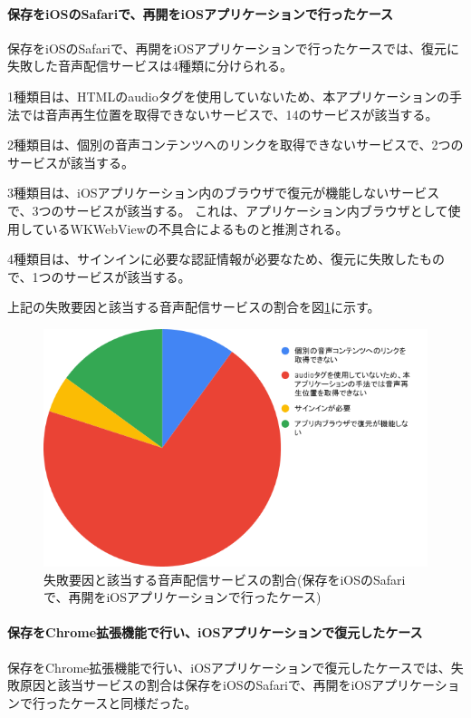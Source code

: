 \paragraph{保存をiOSのSafariで、再開をiOSアプリケーションで行ったケース}
保存をiOSのSafariで、再開をiOSアプリケーションで行ったケースでは、復元に失敗した音声配信サービスは4種類に分けられる。

1種類目は、HTMLのaudioタグを使用していないため、本アプリケーションの手法では音声再生位置を取得できないサービスで、14のサービスが該当する。

2種類目は、個別の音声コンテンツへのリンクを取得できないサービスで、2つのサービスが該当する。

3種類目は、iOSアプリケーション内のブラウザで復元が機能しないサービスで、3つのサービスが該当する。
これは、アプリケーション内ブラウザとして使用しているWKWebViewの不具合によるものと推測される。

4種類目は、サインインに必要な認証情報が必要なため、復元に失敗したもので、1つのサービスが該当する。

上記の失敗要因と該当する音声配信サービスの割合を図\ref{fig:evl-consideration-audio-cause-ratio-ios}に示す。

\begin{figure}[htbp]
  \label{fig:evl-consideration-audio-cause-ratio-ios}
  \begin{center}
    \includegraphics[bb=0 0 600 371,width=15cm]{img/060_evaluation/consideration/audio/cause-ratio-ios.pdf}
  \end{center}
  \caption{失敗要因と該当する音声配信サービスの割合(保存をiOSのSafariで、再開をiOSアプリケーションで行ったケース)}
\end{figure}

\paragraph{保存をChrome拡張機能で行い、iOSアプリケーションで復元したケース}
保存をChrome拡張機能で行い、iOSアプリケーションで復元したケースでは、失敗原因と該当サービスの割合は保存をiOSのSafariで、再開をiOSアプリケーションで行ったケースと同様だった。

